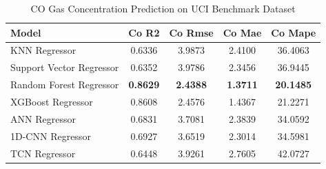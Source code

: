 \begin{table}[htbp]
\centering
\caption{CO Gas Concentration Prediction on UCI Benchmark Dataset}
\label{tab:uci_regression}
\begin{tabular}{lcccc}
\toprule
Model & Co R2 & Co Rmse & Co Mae & Co Mape \\
\midrule
KNN Regressor & 0.6336 & 3.9873 & 2.4100 & 36.4063 \\
Support Vector Regressor & 0.6352 & 3.9786 & 2.3456 & 36.9445 \\
Random Forest Regressor & \textbf{0.8629} & \textbf{2.4388} & \textbf{1.3711} & \textbf{20.1485} \\
XGBoost Regressor & 0.8608 & 2.4576 & 1.4367 & 21.2271 \\
ANN Regressor & 0.6831 & 3.7081 & 2.3839 & 34.0592 \\
1D-CNN Regressor & 0.6927 & 3.6519 & 2.3014 & 34.5981 \\
TCN Regressor & 0.6448 & 3.9261 & 2.7605 & 42.0727 \\
\bottomrule
\end{tabular}
\end{table}